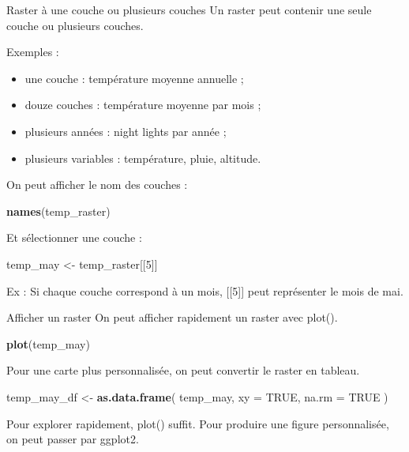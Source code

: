 \documentclass[
  10pt,
  ignorenonframetext,
]{beamer}
\newenvironment{Shaded}{\begin{snugshade}}{\end{snugshade}}
\newcommand{\AttributeTok}[1]{\textcolor[rgb]{0.13,0.29,0.53}{#1}}
\newcommand{\ConstantTok}[1]{\textcolor[rgb]{0.56,0.35,0.01}{#1}}
\newcommand{\DecValTok}[1]{\textcolor[rgb]{0.00,0.00,0.81}{#1}}
\newcommand{\FunctionTok}[1]{\textcolor[rgb]{0.13,0.29,0.53}{\textbf{#1}}}
\newcommand{\NormalTok}[1]{#1}
\newcommand{\OtherTok}[1]{\textcolor[rgb]{0.56,0.35,0.01}{#1}}
\begin{document}
\begin{frame}[fragile]{Raster à une couche ou plusieurs couches}
\label{raster-uxe0-une-couche-ou-plusieurs-couches}
Un raster peut contenir une seule couche ou plusieurs couches.

Exemples :

\begin{itemize}
  \item une couche : température moyenne annuelle ;
  \item douze couches : température moyenne par mois ;
  \item plusieurs années : night lights par année ;
  \item plusieurs variables : température, pluie, altitude.
\end{itemize}

On peut afficher le nom des couches :

\begin{Shaded}
\begin{Highlighting}[]
\FunctionTok{names}\NormalTok{(temp\_raster)}
\end{Highlighting}
\end{Shaded}

Et sélectionner une couche :

\begin{Shaded}
\begin{Highlighting}[]
\NormalTok{temp\_may }\OtherTok{\textless{}{-}}\NormalTok{ temp\_raster[[}\DecValTok{5}\NormalTok{]]}
\end{Highlighting}
\end{Shaded}

Ex : Si chaque couche correspond à un mois, {[}{[}5{]}{]} peut
représenter le mois de mai.
\end{frame}

\begin{frame}[fragile]{Afficher un raster}
\label{afficher-un-raster}
On peut afficher rapidement un raster avec plot().

\begin{Shaded}
\begin{Highlighting}[]
\FunctionTok{plot}\NormalTok{(temp\_may)}
\end{Highlighting}
\end{Shaded}

Pour une carte plus personnalisée, on peut convertir le raster en
tableau.

\begin{Shaded}
\begin{Highlighting}[]
\NormalTok{temp\_may\_df }\OtherTok{\textless{}{-}} \FunctionTok{as.data.frame}\NormalTok{(}
\NormalTok{  temp\_may,}
  \AttributeTok{xy =} \ConstantTok{TRUE}\NormalTok{,}
  \AttributeTok{na.rm =} \ConstantTok{TRUE}
\NormalTok{)}
\end{Highlighting}
\end{Shaded}

Pour explorer rapidement, plot() suffit. Pour produire une figure
personnalisée, on peut passer par ggplot2.
\end{frame}
\end{document}

